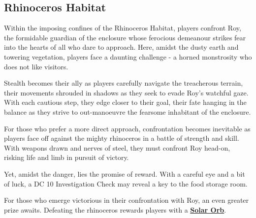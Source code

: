 \subsection*{ Rhinoceros Habitat}
Within the imposing confines of the Rhinoceros Habitat, players confront Roy, the formidable guardian of the enclosure whose ferocious demeanour strikes fear into the hearts of all who dare to approach. Here, amidst the dusty earth and towering vegetation, players face a daunting challenge - a horned monstrosity who does not like visitors.

Stealth becomes their ally as players carefully navigate the treacherous terrain, their movements shrouded in shadows as they seek to evade Roy's watchful gaze. With each cautious step, they edge closer to their goal, their fate hanging in the balance as they strive to out-manoeuvre the fearsome inhabitant of the enclosure.

For those who prefer a more direct approach, confrontation becomes inevitable as players face off against the mighty rhinoceros in a battle of strength and skill. With weapons drawn and nerves of steel, they must confront Roy head-on, risking life and limb in pursuit of victory.

Yet, amidst the danger, lies the promise of reward. With a careful eye and a bit of luck, a DC 10 Investigation Check may reveal a key to the food storage room.

For those who emerge victorious in their confrontation with Roy, an even greater prize awaits. Defeating the rhinoceros rewards players with a \hyperref[sec:SolarOrb]{\textbf{Solar Orb}}.

